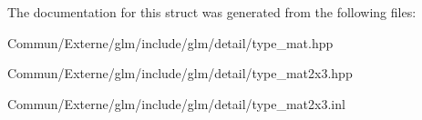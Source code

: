 The documentation for this struct was generated from the following files\+:\begin{DoxyCompactItemize}
\item 
Commun/\+Externe/glm/include/glm/detail/type\+\_\+mat.\+hpp\item 
Commun/\+Externe/glm/include/glm/detail/type\+\_\+mat2x3.\+hpp\item 
Commun/\+Externe/glm/include/glm/detail/type\+\_\+mat2x3.\+inl\end{DoxyCompactItemize}
